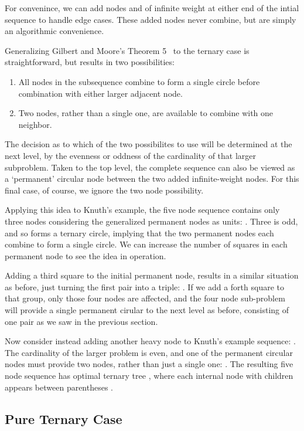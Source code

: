 \documentclass[12pt]{article}
\begin{document}
For convenince, we can add nodes  and  of infinite weight
at either end of the intial sequence to handle edge cases. These added nodes
never combine, but are simply an algorithmic convenience.

Generalizing Gilbert and Moore's Theorem 5~\cite{gilbert59} to the ternary
case is straightforward, but results in two possibilities:

\begin{enumerate}\vspace{-1 mm}
	\item All nodes in the subsequence combine to form a single circle before
	 combination with either larger adjacent node.
	\item Two nodes, rather than a single one, are available to combine with one neighbor.
\end{enumerate}

The decision as to which of the two possibilites to use will be determined at the next
level, by the evenness or oddness of the cardinality of that larger subproblem. 
Taken to the top level, the complete sequence can also be viewed as a `permanent' 
circular node between the two added infinite-weight nodes. For this final case, 
of course, we ignore the two node possibility.

Applying this idea to Knuth's example, the five node sequence 
contains only three nodes considering the generalized permanent nodes as units:
.  Three is odd, and so forms a ternary circle, implying that the
two permanent nodes each combine to form a single circle. We can increase the
number of squares in each permanent node to see the idea in operation.

Adding a third square to the initial permanent node,  
results in a similar situation as before, just turning the first pair into a triple:
. If we add a forth square to that group, only those
four nodes are affected, and the four node sub-problem will provide a single
permanent cirular to the next level as before, consisting of one pair as we saw
in the previous section.

Now consider instead adding another heavy node to Knuth's example sequence:
. The cardinality of the larger problem is even, and
one of the permanent circular nodes must provide two nodes, rather than just a
single one:  .  The resulting five node sequence
has optimal ternary tree , where each internal node
with children  appears between parentheses .

\subsection{Pure Ternary Case}
\end{document}
